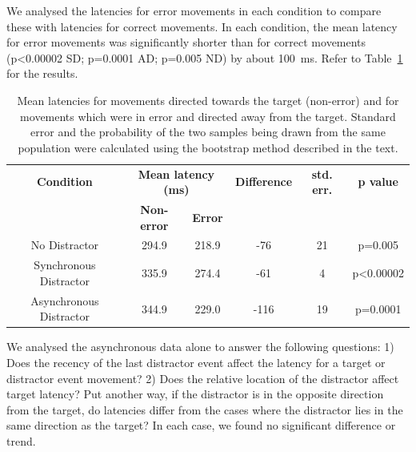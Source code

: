 \documentclass[10pt,letterpaper]{article}
\begin{document}
We analysed the latencies for error movements in each condition to
compare these with latencies for correct movements. In each condition,
the mean latency for error movements was significantly shorter than
for correct movements (p\textless0.00002 SD; p=0.0001 AD; p=0.005 ND) by
about 100~ms. Refer to Table~\ref{table:latencies} for the results.

\begin{table}[ht]
\caption{Mean latencies for movements directed towards the target
  (non-error) and for movements which were in error and directed away
  from the target. Standard error and the probability of the two
  samples being drawn from the same population were calculated using
  the bootstrap method described in the text.}  \centering
\begin{tabular}{c c c c c c}
\hline
\textbf{Condition} & \multicolumn{2}{c}{\textbf{Mean latency (ms)}} & \textbf{Difference} & \textbf{std. err.} & \textbf{p value} \\ [0.5ex]
\multicolumn{1}{c}{~} & \textbf{Non-error} & \textbf{Error} & \multicolumn{3}{c}{~} \\
\hline
No Distractor           & 294.9 & 218.9 &  -76  & 21 & p=0.005\\
Synchronous Distractor  & 335.9 & 274.4 &  -61  & 4  & p\textless0.00002 \\
Asynchronous Distractor & 344.9 & 229.0 & -116  & 19 & p=0.0001 \\ [1ex]
\hline
\end{tabular}
\label{table:latencies}
\end{table}


We analysed the asynchronous data alone to answer the following
questions: 1) Does the recency of the last distractor event affect the
latency for a target or distractor event movement?  2) Does the
relative location of the distractor affect target latency? Put another
way, if the distractor is in the opposite direction from the target,
do latencies differ from the cases where the distractor lies in the
same direction as the target? In each case, we found no significant
difference or trend. %
\end{document}
